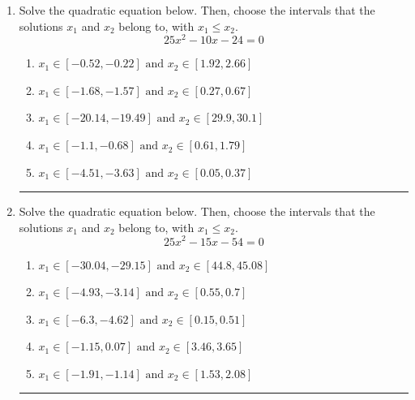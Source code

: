\documentclass[14pt]{extbook}
\newcommand{\litem}[1]{\item#1\hspace*{-1cm}\rule{\textwidth}{0.4pt}}
\begin{document}
\begin{enumerate}
{\begin{enumerate}[label=\Alph*.]
\end{enumerate} }
\litem{
Solve the quadratic equation below. Then, choose the intervals that the solutions $x_1$ and $x_2$ belong to, with $x_1 \leq x_2$.\[ 25x^{2} -10 x -24 = 0 \]\begin{enumerate}[label=\Alph*.]
\item \( x_1 \in [-0.52, -0.22] \text{ and } x_2 \in [1.92, 2.66] \)
\item \( x_1 \in [-1.68, -1.57] \text{ and } x_2 \in [0.27, 0.67] \)
\item \( x_1 \in [-20.14, -19.49] \text{ and } x_2 \in [29.9, 30.1] \)
\item \( x_1 \in [-1.1, -0.68] \text{ and } x_2 \in [0.61, 1.79] \)
\item \( x_1 \in [-4.51, -3.63] \text{ and } x_2 \in [0.05, 0.37] \)

\end{enumerate} }
\litem{
Solve the quadratic equation below. Then, choose the intervals that the solutions $x_1$ and $x_2$ belong to, with $x_1 \leq x_2$.\[ 25x^{2} -15 x -54 = 0 \]\begin{enumerate}[label=\Alph*.]
\item \( x_1 \in [-30.04, -29.15] \text{ and } x_2 \in [44.8, 45.08] \)
\item \( x_1 \in [-4.93, -3.14] \text{ and } x_2 \in [0.55, 0.7] \)
\item \( x_1 \in [-6.3, -4.62] \text{ and } x_2 \in [0.15, 0.51] \)
\item \( x_1 \in [-1.15, 0.07] \text{ and } x_2 \in [3.46, 3.65] \)
\item \( x_1 \in [-1.91, -1.14] \text{ and } x_2 \in [1.53, 2.08] \)


\end{enumerate}}
\end{enumerate}
\end{document}
